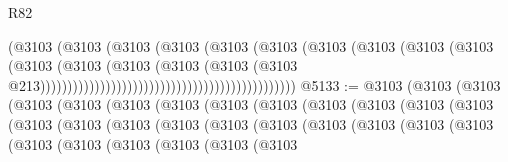 \begin{lexlean}{R82}
\begin{coremodule}
                                                                  (@3103
                                                                    (@3103
                                                                      (@3103
                                                                        (@3103
                                                                          (@3103
                                                                            (@3103
                                                                              (@3103
                                                                                (@3103
                                                                                  (@3103
                                                                                    (@3103
                                                                                      (@3103
                                                                                        (@3103
                                                                                          (@3103
                                                                                            (@3103
                                                                                              (@3103
                                                                                                (@3103
                                                                                                  @213)))))))))))))))))))))))))))))))))))))))))))))))
@5133 := @3103
    (@3103
      (@3103
        (@3103
          (@3103
            (@3103
              (@3103
                (@3103
                  (@3103
                    (@3103
                      (@3103
                        (@3103
                          (@3103
                            (@3103
                              (@3103
                                (@3103
                                  (@3103
                                    (@3103
                                      (@3103
                                        (@3103
                                          (@3103
                                            (@3103
                                              (@3103
                                                (@3103
                                                  (@3103
                                                    (@3103
                                                      (@3103
                                                        (@3103
                                                          (@3103

\end{coremodule}
\end{lexlean}
